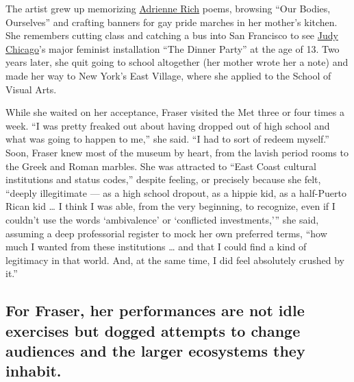 The artist grew up memorizing
\href{https://www.nytimes3xbfgragh.onion/2012/03/29/books/adrienne-rich-feminist-poet-and-author-dies-at-82.html}{Adrienne
Rich} poems, browsing ``Our Bodies, Ourselves'' and crafting banners for
gay pride marches in her mother's kitchen. She remembers cutting class
and catching a bus into San Francisco to see
\href{https://www.nytimes3xbfgragh.onion/2018/02/07/t-magazine/judy-chicago-dinner-party.html}{Judy
Chicago}'s major feminist installation ``The Dinner Party'' at the age
of 13. Two years later, she quit going to school altogether (her mother
wrote her a note) and made her way to New York's East Village, where she
applied to the School of Visual Arts.

While she waited on her acceptance, Fraser visited the Met three or four
times a week. ``I was pretty freaked out about having dropped out of
high school and what was going to happen to me,'' she said. ``I had to
sort of redeem myself.'' Soon, Fraser knew most of the museum by heart,
from the lavish period rooms to the Greek and Roman marbles. She was
attracted to ``East Coast cultural institutions and status codes,''
despite feeling, or precisely because she felt, ``deeply illegitimate
--- as a high school dropout, as a hippie kid, as a half-Puerto Rican
kid \ldots{} I think I was able, from the very beginning, to recognize,
even if I couldn't use the words `ambivalence' or `conflicted
investments,''' she said, assuming a deep professorial register to mock
her own preferred terms, ``how much I wanted from these institutions
\ldots{} and that I could find a kind of legitimacy in that world. And,
at the same time, I did feel absolutely crushed by it.''

\hypertarget{for-fraser-her-performances-are-not-idle-exercises-but-dogged-attempts-to-change-audiences-and-the-larger-ecosystems-they-inhabit}{%
\subsection{For Fraser, her performances are not idle exercises but
dogged attempts to change audiences and the larger ecosystems they
inhabit.}\label{for-fraser-her-performances-are-not-idle-exercises-but-dogged-attempts-to-change-audiences-and-the-larger-ecosystems-they-inhabit}}

